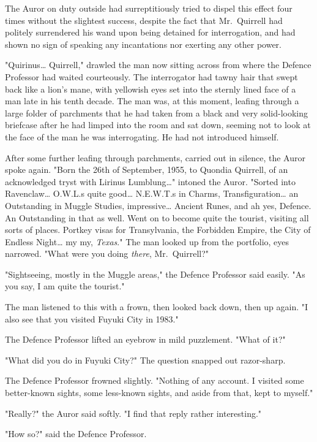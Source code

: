 The Auror on duty outside had surreptitiously tried to dispel this effect four
times without the slightest success, despite the fact that Mr.~Quirrell had
politely surrendered his wand upon being detained for interrogation, and had
shown no sign of speaking any incantations nor exerting any other power.

"Quirinus{\ldots} Quirrell," drawled the man now sitting across from where the
Defence Professor had waited courteously. The interrogator had tawny hair that
swept back like a lion's mane, with yellowish eyes set into the sternly lined
face of a man late in his tenth decade. The man was, at this moment, leafing
through a large folder of parchments that he had taken from a black and very
solid-looking briefcase after he had limped into the room and sat down, seeming
not to look at the face of the man he was interrogating. He had not introduced
himself.

After some further leafing through parchments, carried out in silence, the
Auror spoke again. "Born the 26th of September, 1955, to Quondia Quirrell, of
an acknowledged tryst with Lirinus Lumblung{\ldots}" intoned the Auror. "Sorted
into Ravenclaw{\ldots} O.W.L.s quite good{\ldots} N.E.W.T.s in Charms,
Transfiguration{\ldots} an Outstanding in Muggle Studies, impressive{\ldots}
Ancient Runes, and ah yes, Defence. An Outstanding in that as well. Went on to
become quite the tourist, visiting all sorts of places. Portkey visas for
Transylvania, the Forbidden Empire, the City of Endless Night{\ldots} my my,
\emph{Texas}." The man looked up from the portfolio, eyes narrowed. "What were
you doing \emph{there}, Mr.~Quirrell?"

"Sightseeing, mostly in the Muggle areas," the Defence Professor said easily.
"As you say, I am quite the tourist."

The man listened to this with a frown, then looked back down, then up again. "I
also see that you visited Fuyuki City in 1983."

The Defence Professor lifted an eyebrow in mild puzzlement. "What of it?"

"What did you do in Fuyuki City?" The question snapped out razor-sharp.

The Defence Professor frowned slightly. "Nothing of any account. I visited some
better-known sights, some less-known sights, and aside from that, kept to
myself."

"Really?" the Auror said softly. "I find that reply rather interesting."

"How so?" said the Defence Professor.

